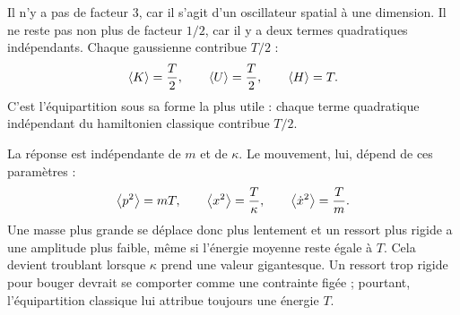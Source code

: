 Il n’y a pas de facteur \(3\), car il s’agit d’un oscillateur spatial à une dimension. Il ne reste pas non plus de facteur \(1/2\), car il y a deux termes quadratiques indépendants. Chaque gaussienne contribue \(T/2\) : \begin{equation}
 \left\langle K\right\rangle=\frac{T}{2},
 \qquad
 \left\langle U\right\rangle=\frac{T}{2},
 \qquad
 \left\langle H\right\rangle=T.
 \label{eq:sm7-equipartition-oscillator}
\end{equation}C’est l’équipartition sous sa forme la plus utile : chaque terme quadratique indépendant du hamiltonien classique contribue \(T/2\).

La réponse est indépendante de \(m\) et de \(\kappa\). Le mouvement, lui, dépend de ces paramètres : \begin{equation}
 \left\langle p^2\right\rangle=mT,
 \qquad
 \left\langle x^2\right\rangle=\frac{T}{\kappa},
 \qquad
 \left\langle\dot{x}^2\right\rangle=\frac{T}{m}.
 \label{eq:sm7-classical-fluctuations}
\end{equation}Une masse plus grande se déplace donc plus lentement et un ressort plus rigide a une amplitude plus faible, même si l’énergie moyenne reste égale à \(T\). Cela devient troublant lorsque \(\kappa\) prend une valeur gigantesque. Un ressort trop rigide pour bouger devrait se comporter comme une contrainte figée ; pourtant, l’équipartition classique lui attribue toujours une énergie \(T\).

\begin{classroomqa}
\end{classroomqa}

\begin{classroomqa}
\end{classroomqa}

